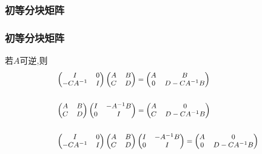 \subsubsection{初等分块矩阵}
\begin{frame}\frametitle{初等分块矩阵}
\begin{example}若$A$可逆,则
\begin{equation*} \footnotesize
\begin{split}
&
\begin{pmatrix}I&0\\-CA^{-1}&I\end{pmatrix} \begin{pmatrix}A&B\\C&D\end{pmatrix} =\begin{pmatrix}A&B\\0&D-CA^{-1}B\end{pmatrix}\\ 
&\\
&
\begin{pmatrix}A&B\\C&D\end{pmatrix} \begin{pmatrix}I&-A^{-1}B\\0&I\end{pmatrix} =\begin{pmatrix}A&0\\C&D-CA^{-1}B\end{pmatrix}\\ 
&\\
&
\begin{pmatrix}I&0\\-CA^{-1}&I\end{pmatrix}\begin{pmatrix}A&B\\C&D\end{pmatrix} \begin{pmatrix}I&-A^{-1}B\\0&I\end{pmatrix} =\begin{pmatrix}A&0\\0&D-CA^{-1}B\end{pmatrix}\\
\end{split}
\end{equation*}
\end{example}
\end{frame}





